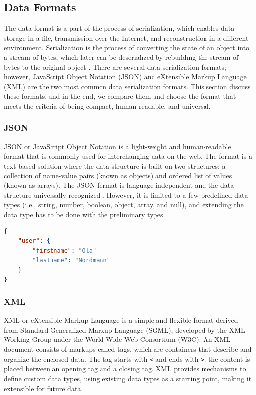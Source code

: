 \subsection{Data Formats} \label{sec:dataformat}

The data format is a part of the process of serialization, which enables data storage in a file, transmission over the Internet, and reconstruction in a different environment. Serialization is the process of converting the state of an object into a stream of bytes, which later can be deserialized by rebuilding the stream of bytes to the original object \cite{sumaray_comparison_2012}. There are several data serialization formats; however, JavaScript Object Notation (JSON) and eXtensible Markup Language (XML) are the two most common data serialization formats. This section discuss these formats, and in the end, we compare them and choose the format that meets the criteria of being compact, human-readable, and universal. 

\subsubsection{JSON}
JSON or JavaScript Object Notation is a light-weight and human-readable format that is commonly used for interchanging data on the web. The format is a text-based solution where the data structure is built on two structures: a collection of name-value pairs (known as objects) and ordered list of values (known as arrays). The JSON format is language-independent and the data structure universally recognized \cite{jsonorg, jsonvxml}. However, it is limited to a few predefined data types (i.e., string, number, boolean, object, array, and null), and extending the data type has to be done with the preliminary types. 

\begin{lstlisting}[language=json, caption={}, captionpos=b]
{
    "user": {
        "firstname": "Ola"
        "lastname": "Nordmann"
    }
}
\end{lstlisting}

\subsubsection{XML}
XML or eXtensible Markup Language is a simple and flexible format derived from Standard Generalized Markup Language (SGML), developed by the XML Working Group under the World Wide Web Consortium (W3C). An XML document consists of markups called tags, which are containers that describe and organize the enclosed data. The tag starts with \verb|<| and ends with \verb|>|; the content is placed between an opening tag and a closing tag. \cite{w3xml, jsonvxml} XML provides mechanisms to define custom data types, using existing data types as a starting point, making it extensible for future data. 

